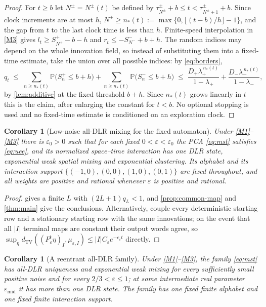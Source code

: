 \documentclass[11pt]{article}
\theoremstyle{plain}
\newtheorem{corollary}[theorem]{Corollary}
\theoremstyle{definition}
\theoremstyle{remark}
\newcommand{\Prob}{\mathbb{P}}
\newcommand{\dtv}{d_{\mathrm{TV}}}
\newcommand{\eps}{\varepsilon}
\begin{document}
\begin{proof}
For $t\ge b$ let $N^\pm=N^\pm(t)$ be defined by $\tau^\pm_{N^\pm}+b\le t<\tau^\pm_{N^\pm+1}+b$. Since clock increments are at most $h$, $N^\pm\ge n_*(t):=\max\{0,\lfloor(t-b)/h\rfloor-1\}$, and the gap from $t$ to the last clock time is less than $h$. Finite-speed interpolation in \ref{M3} gives $l_t\ge S^+_{N^+}-b-h$ and $r_t\le-S^-_{N^-}+b+h$. The random indices may depend on the whole innovation field, so instead of substituting them into a fixed-time estimate, take the union over all possible indices: by \eqref{eq:borders},
\[
q_t\;\le\;\sum_{n\ge n_*(t)}\Prob\bigl(S^+_n\le b+h\bigr)+\sum_{n\ge n_*(t)}\Prob\bigl(S^-_n\le b+h\bigr)\;\le\;\frac{D_+\lambda_+^{\,n_*(t)}}{1-\lambda_+}+\frac{D_-\lambda_-^{\,n_*(t)}}{1-\lambda_-},
\]
by \cref{lem:additive} at the fixed threshold $b+h$. Since $n_*(t)$ grows linearly in $t$ this is the claim, after enlarging the constant for $t<b$. No optional stopping is used and no fixed-time estimate is conditioned on an exploration clock.
\end{proof}

\begin{corollary}[Low-noise all-DLR mixing for the fixed automaton]
\label{cor:mst-low}
Under \ref{M1}--\ref{M3} there is $\eps_0>0$ such that for each fixed $0<\eps<\eps_0$ the PCA \eqref{eq:mst} satisfies \eqref{eq:uee}, and its normalized space--time interaction has one DLR state, exponential weak spatial mixing and exponential clustering. Its alphabet and its interaction support $\{(-1,0),(0,0),(1,0),(0,1)\}$ are fixed throughout, and all weights are positive and rational whenever $\eps$ is positive and rational.
\end{corollary}

\begin{proof}
 gives a finite $L$ with $(2L+1)q_L<1$, and \cref{prop:common-map} and \cref{thm:main} give the conclusions. Alternatively, couple every deterministic starting row and a stationary starting row with the same innovations; on the event that all $|I|$ terminal maps are constant their output words agree, so $\sup_\eta\dtv((P^t_\eps\eta)_I,\mu_{\eps,I})\le|I|C_\eps e^{-c_\eps t}$ directly.
\end{proof}

\begin{corollary}[A reentrant all-DLR family]
\label{cor:reentrant}
Under \ref{M1}--\ref{M3}, the family \eqref{eq:mst} has all-DLR uniqueness and exponential weak mixing for every sufficiently small positive noise and for every $2/3<\eps\le1$; at some intermediate real parameter $\eps_{\mathrm{mid}}$ it has more than one DLR state. The family has one fixed finite alphabet and one fixed finite interaction support.
\end{corollary}
\end{document}
